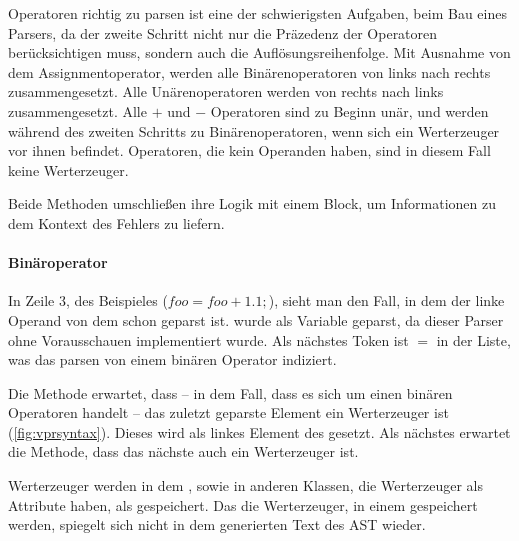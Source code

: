 {{{      Operatoren richtig zu parsen ist eine der schwierigsten Aufgaben, beim Bau eines Parsers, da der zweite Schritt nicht nur die Präzedenz der Operatoren berücksichtigen muss, sondern auch die Auflösungsreihenfolge. Mit Ausnahme von dem Assignmentoperator, werden alle Binärenoperatoren von links nach rechts zusammengesetzt. Alle Unärenoperatoren werden von rechts nach links zusammengesetzt. Alle \myMIn$+$ und \myMIn$-$ Operatoren sind zu Beginn unär, und werden während des zweiten Schritts zu Binärenoperatoren, wenn sich ein Werterzeuger vor ihnen befindet. Operatoren, die kein Operanden haben, sind in diesem Fall keine Werterzeuger.

      Beide Methoden umschließen ihre Logik mit einem  Block, um Informationen zu dem Kontext des Fehlers zu liefern.

      \paragraph{Binäroperator}
        In Zeile 3, des Beispieles (\myMIn$foo = foo + 1.1;$), sieht man den Fall, in dem der linke Operand von dem  schon geparst ist.  wurde als Variable geparst, da dieser Parser ohne Vorausschauen implementiert wurde. Als nächstes Token ist \myTIn$=$ in der Liste, was das parsen von einem binären Operator indiziert.

        Die  Methode erwartet, dass -- in dem Fall, dass es sich um einen binären Operatoren handelt -- das zuletzt geparste Element ein Werterzeuger ist (\autoref{fig:vprsyntax}). Dieses wird als linkes Element des  gesetzt. Als nächstes erwartet die Methode, dass das nächste  auch ein Werterzeuger ist.

        Werterzeuger werden in dem , sowie in anderen Klassen, die Werterzeuger als Attribute haben, als  gespeichert. Das die Werterzeuger, in einem  gespeichert werden, spiegelt sich nicht in dem generierten Text des AST wieder.

}}}
